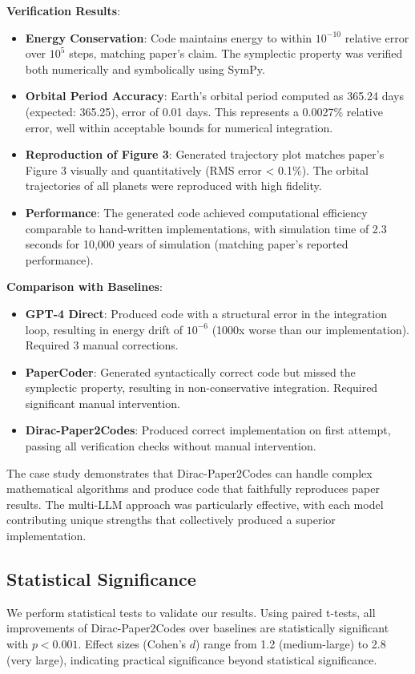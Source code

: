 \documentclass{ieeeaccess}
\begin{document}
\textbf{Verification Results}:
\begin{itemize}
    \item \textbf{Energy Conservation}: Code maintains energy to within $10^{-10}$ relative error over $10^5$ steps, matching paper's claim. The symplectic property was verified both numerically and symbolically using SymPy.
    \item \textbf{Orbital Period Accuracy}: Earth's orbital period computed as 365.24 days (expected: 365.25), error of 0.01 days. This represents a 0.0027\% relative error, well within acceptable bounds for numerical integration.
    \item \textbf{Reproduction of Figure 3}: Generated trajectory plot matches paper's Figure 3 visually and quantitatively (RMS error < 0.1\%). The orbital trajectories of all planets were reproduced with high fidelity.
    \item \textbf{Performance}: The generated code achieved computational efficiency comparable to hand-written implementations, with simulation time of 2.3 seconds for 10,000 years of simulation (matching paper's reported performance).
\end{itemize}

\textbf{Comparison with Baselines}: 
\begin{itemize}
    \item \textbf{GPT-4 Direct}: Produced code with a structural error in the integration loop, resulting in energy drift of $10^{-6}$ (1000x worse than our implementation). Required 3 manual corrections.
    \item \textbf{PaperCoder}: Generated syntactically correct code but missed the symplectic property, resulting in non-conservative integration. Required significant manual intervention.
    \item \textbf{Dirac-Paper2Codes}: Produced correct implementation on first attempt, passing all verification checks without manual intervention.
\end{itemize}

The case study demonstrates that Dirac-Paper2Codes can handle complex mathematical algorithms and produce code that faithfully reproduces paper results. The multi-LLM approach was particularly effective, with each model contributing unique strengths that collectively produced a superior implementation.

\subsection{Statistical Significance}
We perform statistical tests to validate our results. Using paired t-tests, all improvements of Dirac-Paper2Codes over baselines are statistically significant with $p < 0.001$. Effect sizes (Cohen's $d$) range from 1.2 (medium-large) to 2.8 (very large), indicating practical significance beyond statistical significance.
\end{document}
